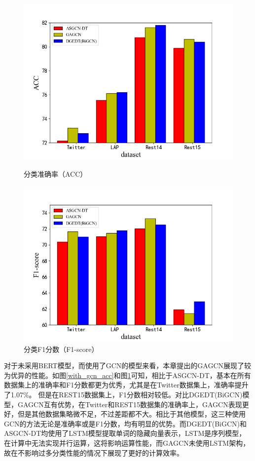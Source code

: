 \begin{figure}[htb]
    \begin{minipage}[t]{0.5\linewidth}
    \centering
    \includegraphics[width=1\textwidth]{pic/gcnacc.png}
    \caption{分类准确率（ACC）}
    \label{with_gcn_acc}
    \end{minipage}
    \quad
    \begin{minipage}[t]{0.5\linewidth}
    \centering
    \includegraphics[width=1\textwidth]{pic/gcnf1.png}
    \caption{分类F1分数（F1-score）}
    \label{with_gcn_f1}
    \end{minipage}
\end{figure}

对于未采用BERT模型，而使用了GCN的模型来看，本章提出的GAGCN展现了较为优异的性能。如图\ref{with_gcn_acc}和图\ref{with_gcn_f1}可知，相比于ASGCN-DT，基本在所有数据集上的准确率和F1分数都更为优秀，尤其是在Twitter数据集上，准确率提升了1.07\%。
但是在REST15数据集上，F1分数相对较低。对比DGEDT(BiGCN)模型，GAGCN互有优势，在Twitter和REST15数据集的准确率上，GAGCN表现更好，但是其他数据集略微不足，不过差距都不大。相比于其他模型，这三种使用
GCN的方法无论是准确率或是F1分数，均有明显的优势。而DGEDT(BiGCN)和ASGCN-DT均使用了LSTM模型提取单词的隐藏向量表示，LSTM是序列模型，在计算中无法实现并行运算，这将影响运算性能，而GAGCN未使用LSTM架构，
故在不影响过多分类性能的情况下展现了更好的计算效率。

